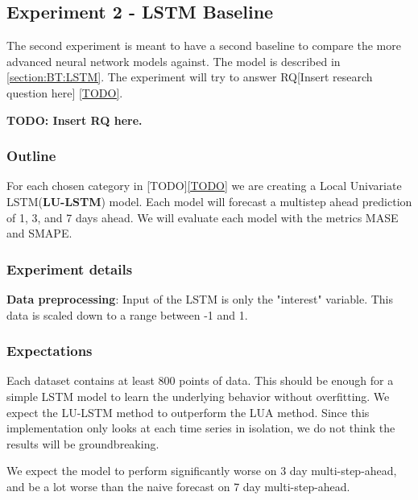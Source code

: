 \subsection{Experiment 2 - LSTM Baseline}
\label{section:Method:LSTM}
The second experiment is meant to have a second baseline to compare the more
advanced neural network models against. The model is described in
\cref{section:BT:LSTM}. The experiment will try to answer
RQ[Insert research question here] \cref{TODO}.


\textbf{TODO: Insert RQ here.}

\subsubsection{Outline}
For each chosen category in [TODO]\cref{TODO} we are creating a Local Univariate LSTM(\textbf{LU-LSTM})
model. Each model will forecast a multistep ahead prediction of 1, 3, and 7 days ahead.
We will evaluate each model with the metrics MASE and SMAPE.

\subsubsection{Experiment details}

\textbf{Data preprocessing}: Input of the LSTM is only the "interest" variable.
This data is scaled down to a range between -1 and 1.

\subsubsection{Expectations}
Each dataset contains at least 800 points of data.
This should be enough for a simple LSTM model to learn the underlying
behavior without overfitting. We expect the LU-LSTM method to outperform the LUA method.
Since this implementation only looks at each time series in isolation, we do
not think the results will be groundbreaking.

We expect the model to perform significantly worse on 3 day multi-step-ahead,
and be a lot worse than the naive forecast on 7 day multi-step-ahead.

